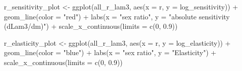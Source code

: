 \documentclass[
  letterpaper,
  DIV=11,
  numbers=noendperiod]{scrartcl}
\newenvironment{Shaded}{\begin{snugshade}}{\end{snugshade}}
\newcommand{\AttributeTok}[1]{\textcolor[rgb]{0.40,0.45,0.13}{#1}}
\newcommand{\DecValTok}[1]{\textcolor[rgb]{0.68,0.00,0.00}{#1}}
\newcommand{\FloatTok}[1]{\textcolor[rgb]{0.68,0.00,0.00}{#1}}
\newcommand{\FunctionTok}[1]{\textcolor[rgb]{0.28,0.35,0.67}{#1}}
\newcommand{\NormalTok}[1]{\textcolor[rgb]{0.00,0.23,0.31}{#1}}
\newcommand{\OtherTok}[1]{\textcolor[rgb]{0.00,0.23,0.31}{#1}}
\newcommand{\SpecialCharTok}[1]{\textcolor[rgb]{0.37,0.37,0.37}{#1}}
\newcommand{\StringTok}[1]{\textcolor[rgb]{0.13,0.47,0.30}{#1}}
\begin{document}
\begin{Shaded}
\begin{Highlighting}[]
\NormalTok{r\_sensitivity\_plot }\OtherTok{\textless{}{-}} \FunctionTok{ggplot}\NormalTok{(all\_r\_lam3, }\FunctionTok{aes}\NormalTok{(}\AttributeTok{x =}\NormalTok{ r, }\AttributeTok{y =}\NormalTok{ log\_sensitivity)) }\SpecialCharTok{+}
  \FunctionTok{geom\_line}\NormalTok{(}\AttributeTok{color =} \StringTok{"red"}\NormalTok{) }\SpecialCharTok{+}
  \FunctionTok{labs}\NormalTok{(}\AttributeTok{x =} \StringTok{"sex ratio"}\NormalTok{,}
       \AttributeTok{y =} \StringTok{"absolute sensitivity (dLam3/dm)"}\NormalTok{) }\SpecialCharTok{+}
  \FunctionTok{scale\_x\_continuous}\NormalTok{(}\AttributeTok{limits =} \FunctionTok{c}\NormalTok{(}\DecValTok{0}\NormalTok{, }\FloatTok{0.9}\NormalTok{))}

\NormalTok{r\_elasticity\_plot }\OtherTok{\textless{}{-}} \FunctionTok{ggplot}\NormalTok{(all\_r\_lam3, }\FunctionTok{aes}\NormalTok{(}\AttributeTok{x =}\NormalTok{ r, }\AttributeTok{y =}\NormalTok{ log\_elasticity)) }\SpecialCharTok{+}
  \FunctionTok{geom\_line}\NormalTok{(}\AttributeTok{color =} \StringTok{"blue"}\NormalTok{) }\SpecialCharTok{+}
  \FunctionTok{labs}\NormalTok{(}\AttributeTok{x =} \StringTok{"sex ratio"}\NormalTok{,}
       \AttributeTok{y =} \StringTok{"Elasticity"}\NormalTok{) }\SpecialCharTok{+}
  \FunctionTok{scale\_x\_continuous}\NormalTok{(}\AttributeTok{limits =} \FunctionTok{c}\NormalTok{(}\DecValTok{0}\NormalTok{, }\FloatTok{0.9}\NormalTok{))}


\end{Highlighting}
\end{Shaded}
\end{document}
